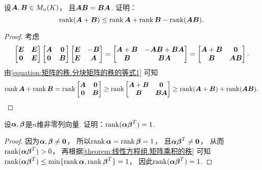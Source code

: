 \begin{example}\label{example:矩阵乘积的秩.可交换矩阵之和的秩}
设\(\boldsymbol{A},\boldsymbol{B}\in M_n(K)\)，
且\(\boldsymbol{A} \boldsymbol{B}=\boldsymbol{B}\boldsymbol{A}\).
证明：\[
	\rank(\boldsymbol{A}+\boldsymbol{B})\leq\rank\boldsymbol{A}+\rank\boldsymbol{B}-\rank(\boldsymbol{A} \boldsymbol{B}).
\]
\begin{proof}
考虑\[
	\begin{bmatrix}
		\boldsymbol{E} & \boldsymbol{E} \\
		\boldsymbol0 & \boldsymbol{E}
	\end{bmatrix}
	\begin{bmatrix}
		\boldsymbol{A} & \boldsymbol0 \\
		\boldsymbol0 & \boldsymbol{B}
	\end{bmatrix}
	\begin{bmatrix}
		\boldsymbol{E} & -\boldsymbol{B} \\
		\boldsymbol{E} & \boldsymbol{A}
	\end{bmatrix}
	= \begin{bmatrix}
		\boldsymbol{A}+\boldsymbol{B} & -\boldsymbol{A} \boldsymbol{B}+\boldsymbol{B}\boldsymbol{A} \\
		\boldsymbol{B} & \boldsymbol{B}\boldsymbol{A}
	\end{bmatrix}
	= \begin{bmatrix}
		\boldsymbol{A}+\boldsymbol{B} & \boldsymbol0 \\
		\boldsymbol{B} & \boldsymbol{A} \boldsymbol{B}
	\end{bmatrix}.
\]
由\cref{equation:矩阵的秩.分块矩阵的秩的等式1} 可知\[
	\rank\boldsymbol{A}+\rank\boldsymbol{B}
	= \rank\begin{bmatrix}
		\boldsymbol{A} & \boldsymbol0 \\
		\boldsymbol0 & \boldsymbol{B}
	\end{bmatrix}
	\geq \rank\begin{bmatrix}
		\boldsymbol{A}+\boldsymbol{B} & \boldsymbol0 \\
		\boldsymbol{B} & \boldsymbol{B}\boldsymbol{A}
	\end{bmatrix}
	\geq \rank(\boldsymbol{A}+\boldsymbol{B}) + \rank(\boldsymbol{A} \boldsymbol{B}).
	\qedhere
\]
\end{proof}
\end{example}

\begin{example}\label{example:矩阵乘积的秩.两个向量的乘积的秩}
设\(\boldsymbol\alpha,\boldsymbol\beta\)是\(n\)维非零列向量.
证明：\(\rank(\boldsymbol\alpha\boldsymbol\beta^T)=1\).
\begin{proof}
因为\(\boldsymbol\alpha,\boldsymbol\beta\neq\boldsymbol0\)，
所以\(\rank\boldsymbol\alpha=\rank\boldsymbol\beta=1\)，
且\(\boldsymbol\alpha\boldsymbol\beta^T\neq\boldsymbol0\)，
从而\(\rank(\boldsymbol\alpha\boldsymbol\beta^T)>0\)，
再根据\cref{theorem:线性方程组.矩阵乘积的秩} 可知
\(\rank(\boldsymbol\alpha\boldsymbol\beta^T)
\leq \min\{\rank\boldsymbol\alpha,\rank\boldsymbol\beta^T\}
= 1\)，
因此\(\rank(\boldsymbol\alpha\boldsymbol\beta^T)=1\).
\end{proof}
\end{example}

